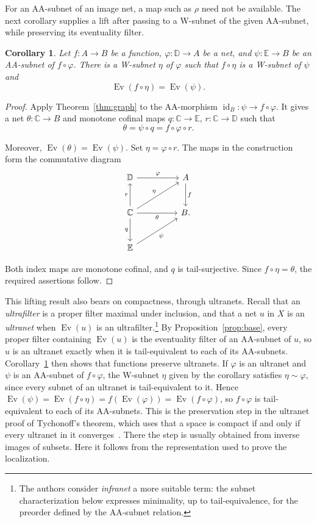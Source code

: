\documentclass[11pt,a4paper]{article}
\newtheorem{corollary}[theorem]{Corollary}
\theoremstyle{definition}
\theoremstyle{remark}
\newcommand{\Ev}{\operatorname{Ev}}
\newcommand{\id}{\operatorname{id}}
\begin{document}
For an AA-subnet of an image net, a map such as \(\rho\) need
not be available. The next corollary supplies a lift after passing
to a W-subnet of the given AA-subnet, while preserving its
eventuality filter.

\begin{corollary}\label{cor:subnetlifting}
Let \(f:A\to B\) be a function, \(\varphi:\mathbb D\to A\) be
a net, and \(\psi:\mathbb E\to B\) be an AA-subnet of
\(f\circ\varphi\). There is a W-subnet \(\eta\) of \(\varphi\)
such that \(f\circ\eta\) is a W-subnet of \(\psi\) and
\[
 \Ev(f\circ\eta)=\Ev(\psi).
\]
\end{corollary}
\begin{proof}
Apply Theorem~\ref{thm:graph} to the AA-morphism
\(\id_B:\psi\to f\circ\varphi\). It gives a net
\(\theta:\mathbb C\to B\) and monotone cofinal maps
\(q:\mathbb C\to\mathbb E\), \(r:\mathbb C\to\mathbb D\) such
that
\[
 \theta=\psi\circ q=f\circ\varphi\circ r.
\]

Moreover, \(\Ev(\theta)=\Ev(\psi)\). Set \(\eta=\varphi\circ r\). The maps in the construction form
the commutative diagram
\[
 \begin{tikzcd}[row sep=large,column sep=huge]
  \mathbb D\arrow[r,"\varphi"]&A\arrow[d,"f"]\\
  \mathbb C\arrow[u,"r"]\arrow[ur,"\eta",description]
    \arrow[r,"\theta"']\arrow[d,"q"']&B.\\
  \mathbb E\arrow[ur,"\psi"']&
 \end{tikzcd}
\]

Both index maps are monotone cofinal, and \(q\) is tail-surjective.
Since \(f\circ\eta=\theta\), the required assertions follow.
\end{proof}

This lifting result also bears on compactness, through ultranets.
Recall that an \emph{ultrafilter} is a proper filter
maximal under inclusion, and that a net \(u\) in \(X\) is an
\emph{ultranet} when \(\Ev(u)\) is an ultrafilter.\footnote{The
authors consider \emph{infranet} a more suitable term: the subnet
characterization below expresses minimality, up to tail-equivalence,
for the preorder defined by the AA-subnet relation.}
By Proposition~\ref{prop:base}, every proper filter containing
\(\Ev(u)\) is the eventuality filter of an AA-subnet of \(u\), so
\(u\) is an ultranet exactly when it is tail-equivalent to each of its
AA-subnets. Corollary~\ref{cor:subnetlifting} then shows that functions
preserve ultranets. If \(\varphi\) is an ultranet and \(\psi\) is an
AA-subnet of \(f\circ\varphi\), the W-subnet \(\eta\) given by the
corollary satisfies \(\eta\sim\varphi\), since every subnet of an
ultranet is tail-equivalent to it. Hence
\(\Ev(\psi)=\Ev(f\circ\eta)=f(\Ev(\varphi))=\Ev(f\circ\varphi)\), so
\(f\circ\varphi\) is tail-equivalent to each of its AA-subnets.
This is the preservation step in the ultranet proof of Tychonoff's
theorem, which uses that a space is compact if and only if every
ultranet in it converges~\cite[Section~7.5.6]{MuegerTopology}. There
the step is usually obtained from inverse images of subsets. Here it
follows from the representation used to prove the localization.
\end{document}
